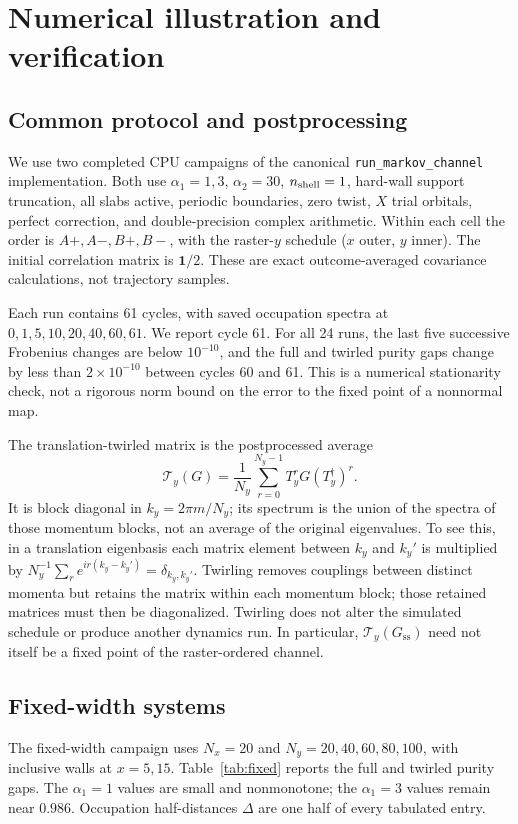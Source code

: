 \documentclass[aps,prb,onecolumn,nofootinbib,superscriptaddress,floatfix]{revtex4-2}
\newcommand{\id}{\mathbf 1}
\newcommand{\steady}{\mathrm{ss}}
\begin{document}
\section{Numerical illustration and verification}
\label{sec:numerics}
\subsection{Common protocol and postprocessing}
We use two completed CPU campaigns of the canonical
\texttt{run\_markov\_channel} implementation. Both use
$\alpha_1=1,3$, $\alpha_2=30$, $n_{\rm shell}=1$, hard-wall
support truncation, all slabs active, periodic boundaries, zero
twist, $X$ trial orbitals, perfect correction, and double-precision
complex arithmetic. Within each cell the order is
$A+,A-,B+,B-$, with the raster-$y$ schedule ($x$ outer, $y$ inner).
The initial correlation matrix is $\id/2$. These are exact
outcome-averaged covariance calculations, not trajectory samples.

Each run contains 61 cycles, with saved occupation spectra at
$0,1,5,10,20,40,60,61$. We report cycle 61. For all 24 runs,
the last five successive Frobenius changes are below $10^{-10}$,
and the full and twirled purity gaps change by less than
$2\times10^{-10}$ between cycles 60 and 61. This is a numerical
stationarity check, not a rigorous norm bound on the error to the
fixed point of a nonnormal map.

The translation-twirled matrix is the postprocessed average
\begin{equation}
 \mathcal T_y(G)=\frac1{N_y}\sum_{r=0}^{N_y-1}
        T_y^rG(T_y^\dagger)^r. \label{eq:twirl}
\end{equation}
It is block diagonal in $k_y=2\pi m/N_y$; its spectrum is the union
of the spectra of those momentum blocks, not an average of the
original eigenvalues. To see this, in a translation eigenbasis
each matrix element between $k_y$ and $k_y'$ is multiplied by
$N_y^{-1}\sum_r e^{ir(k_y-k_y')}=\delta_{k_y,k_y'}$.
Twirling removes couplings between distinct momenta but retains
the matrix within each momentum block; those retained matrices
must then be diagonalized. Twirling does not alter the simulated
schedule or produce another dynamics run. In particular,
$\mathcal T_y(G_\steady)$ need not itself be a fixed point of the
raster-ordered channel.

\subsection{Fixed-width systems}
The fixed-width campaign uses $N_x=20$ and
$N_y=20,40,60,80,100$, with inclusive walls at $x=5,15$.
Table~\ref{tab:fixed} reports the full and twirled purity gaps.
The $\alpha_1=1$ values are small and nonmonotone; the
$\alpha_1=3$ values remain near $0.986$. Occupation half-distances
$\Delta$ are one half of every tabulated entry.
\end{document}
